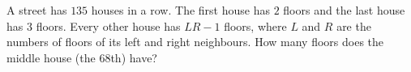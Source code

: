 A street has $135$ houses in a row. The first house has $2$ floors and the last house has $3$ floors. Every other house has $LR-1$ floors, where $L$ and $R$ are the numbers of floors of its left and right neighbours. How many floors does the middle house (the $68$th) have?
